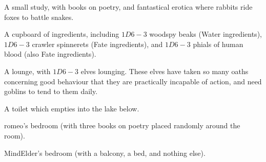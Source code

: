 \begin{multicols}{2}
\begin{dlist}
  \item
  A small study, with books on poetry, and fantastical erotica where rabbits ride foxes to battle snakes.
  \item
  A cupboard of \glspl{ingredient}, including $1D6-3$ woodspy beaks (Water \glspl{ingredient}), $1D6-3$ \gls{crawler} spinnerets (Fate \glspl{ingredient}), and $1D6-3$ phials of human blood (also Fate \glspl{ingredient}).
  \item
  A lounge, with $1D6-3$ elves lounging.
  These elves have taken so many oaths concerning good behaviour that they are practically incapable of action, and need goblins to tend to them daily.
  \item
  A toilet which empties into the lake below.
  \item
  \gls{romeo}'s bedroom (with three books on poetry placed randomly around the room).
  \item
  \gls{MindElder}'s bedroom (with a balcony, a bed, and nothing else).
\end{dlist}

\MindElder

\showStdSpells

\end{multicols}

